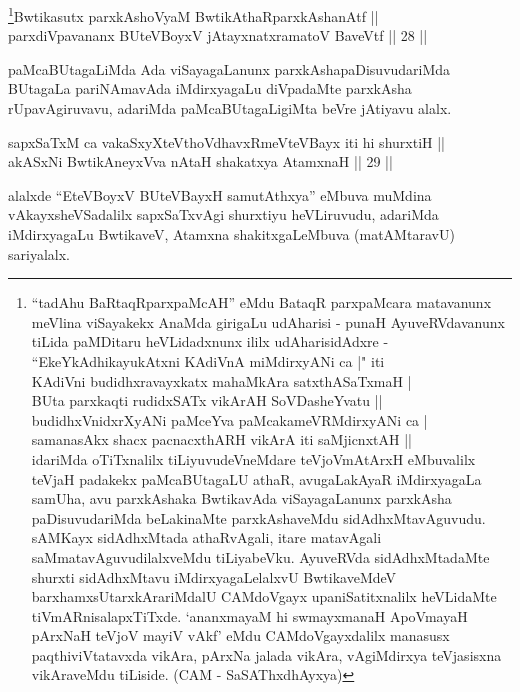 \begin{shl}
\footnote{``tadAhu BaRtaqRparxpaMcAH'' eMdu BataqR parxpaMcara matavanunx meVlina
viSayakekx AnaMda girigaLu udAharisi - punaH AyuveRVdavanunx tiLida
paMDitaru heVLidadxnunx ililx udAharisidAdxre - 
``EkeYkAdhikayukAtxni KAdiVnA miMdirxyANi ca |" iti \\
KAdiVni budidhxravayxkatx mahaMkAra satxthA\s  SaTxmaH |\\
BUta parxkaqti rudidxSATx vikArAH SoVDasheYvatu ||\\
budidhxVnidxrXyANi paMceYva paMcakameVRMdirxyANi ca |\\
samanasAkx shacx pacnacxthARH vikArA iti saMjicnxtAH ||\\
idariMda oTiTxnalilx tiLiyuvudeVneMdare teVjoVmAtArxH eMbuvalilx
teVjaH padakekx paMcaBUtagaLU athaR, avugaLakAyaR iMdirxyagaLa samUha,
avu parxkAshaka BwtikavAda viSayagaLanunx parxkAsha paDisuvudariMda
beLakinaMte parxkAshaveMdu sidAdhxMtavAguvudu. sAMKayx sidAdhxMtada
athaRvAgali, itare matavAgali saMmatavAguvudilalxveMdu tiLiyabeVku.
AyuveRVda sidAdhxMtadaMte shurxti sidAdhxMtavu iMdirxyagaLelalxvU
BwtikaveMdeV barxhamxsUtarxkArariMdalU CAMdoVgayx upaniSatitxnalilx
heVLidaMte tiVmARnisalapxTiTxde. `ananxmayaM hi swmayxmanaH ApoVmayaH pArxNaH teVjoV mayiV vAkf' eMdu CAMdoVgayxdalilx
manasusx paqthiviVtatavxda vikAra, pArxNa jalada vikAra, vAgiMdirxya
teVjasisxna vikAraveMdu tiLiside. (CAM - SaSAThxdhAyxya)}Bwtikasutx parxkAshoV\s yaM BwtikAthaRparxkAshanAtf || \\
parxdiVpavananx BUteVBoyxV jAtayxnatxramatoV BaveVtf \hfill || 28 ||
  
\end{shl}

\begin{artha}
paMcaBUtagaLiMda Ada viSayagaLanunx
parxkAshapaDisuvudariMda BUtagaLa pariNAmavAda iMdirxyagaLu diVpadaMte
parxkAsha rUpavAgiruvavu, adariMda paMcaBUtagaLigiMta beVre jAtiyavu alalx.
\end{artha}


\begin{shl}
sapxSaTxM ca vakaSxyXteV\s thoVdhavxRmeVteVBayx iti hi shurxtiH || \\
akASxNi BwtikAneyxVva nAtaH shakatxya AtamxnaH \hfill || 29 ||
  
\end{shl}

\begin{artha}
alalxde ``EteVBoyxV BUteVBayxH samutAthxya'' eMbuva muMdina vAkayxsheVSadalilx sapxSaTxvAgi
shurxtiyu heVLiruvudu, adariMda iMdirxyagaLu BwtikaveV,
Atamxna shakitxgaLeMbuva (matAMtaravU) sariyalalx.
\end{artha}

